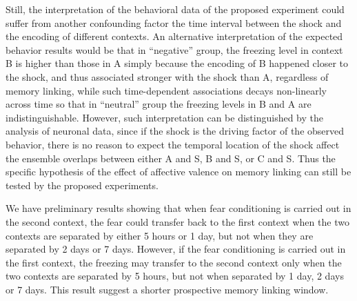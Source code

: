 \documentclass[master.tex]{subfiles}
\begin{document}
Still, the interpretation of the behavioral data of the proposed experiment
could suffer from another confounding factor \textemdash{} the time interval
between the shock and the encoding of different contexts. An alternative
interpretation of the expected behavior results would be that in ``negative''
group, the freezing level in context B is higher than those in A simply because
the encoding of B happened closer to the shock, and thus associated stronger
with the shock than A, regardless of memory linking, while such time-dependent
associations decays non-linearly across time so that in ``neutral'' group the
freezing levels in B and A are indistinguishable. However, such interpretation
can be distinguished by the analysis of neuronal data, since if the shock is the
driving factor of the observed behavior, there is no reason to expect the
temporal location of the shock affect the ensemble overlaps between either A and
S, B and S, or C and S. Thus the specific hypothesis of the effect of affective
valence on memory linking can still be tested by the proposed experiments.

We have preliminary results showing that when fear conditioning is carried out
in the second context, the fear could transfer back to the first context when
the two contexts are separated by either 5 hours or 1 day, but not when they are
separated by 2 days or 7 days. However, if the fear conditioning is carried out
in the first context, the freezing may transfer to the second context only when
the two contexts are separated by 5 hours, but not when separated by 1 day, 2
days or 7 days. This result suggest a shorter prospective memory linking window.
\end{document}
